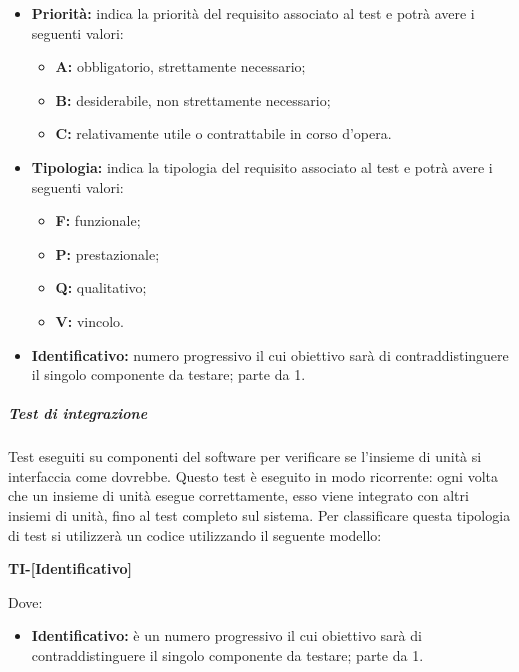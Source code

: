                 \begin{itemize}
	                \item \textbf{Priorità:} indica la priorità del requisito associato al test e potrà avere i seguenti valori:
		                \begin{itemize}
		                    \item \textbf{A:} obbligatorio, strettamente necessario;
		                    \item \textbf{B:} desiderabile, non strettamente necessario;
		                    \item \textbf{C:} relativamente utile o contrattabile in corso d'opera. 
		                 \end{itemize} 
	                 \item \textbf{Tipologia:} indica la tipologia del requisito associato al test e potrà avere i seguenti valori:
		                 \begin{itemize}
		                    \item \textbf{F:} funzionale;
		                    \item \textbf{P:} prestazionale;
		                    \item \textbf{Q:} qualitativo;
		                    \item \textbf{V:} vincolo.
		                 \end{itemize}
	                \item \textbf{Identificativo:} numero progressivo il cui obiettivo sarà di contraddistinguere il singolo componente da testare; parte da 1.
                \end{itemize}

                 \subparagraph*{Test di integrazione}
        			Test eseguiti su componenti del software per verificare se l'insieme di unità si interfaccia come dovrebbe. Questo test è eseguito in modo ricorrente: ogni volta che un insieme di unità esegue correttamente, esso viene integrato con altri insiemi di unità, fino al test completo sul sistema.
                    Per classificare questa tipologia di test si utilizzerà un codice utilizzando il seguente modello:     

                        \begin{center}
                        	\textbf{TI-[Identificativo]}
                        \end{center}
                        Dove:
                        
						\begin{itemize}
                       		\item \textbf{Identificativo:} è un numero progressivo il cui obiettivo sarà di contraddistinguere il singolo componente da testare; parte da 1.
						\end{itemize}
					
